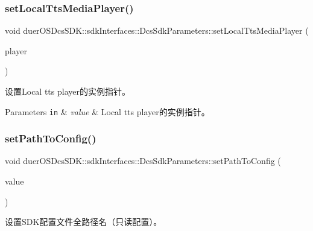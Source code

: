 \subsubsection{\texorpdfstring{set\+Local\+Tts\+Media\+Player()}{setLocalTtsMediaPlayer()}}
{\footnotesize\ttfamily void duer\+O\+S\+Dcs\+S\+D\+K\+::sdk\+Interfaces\+::\+Dcs\+Sdk\+Parameters\+::set\+Local\+Tts\+Media\+Player (\begin{DoxyParamCaption}\item[{std\+::shared\+\_\+ptr$<$ \hyperlink{classduerOSDcsSDK_1_1sdkInterfaces_1_1MediaPlayerInterface}{Media\+Player\+Interface} $>$}]{player }\end{DoxyParamCaption})\hspace{0.3cm}{\ttfamily [inline]}}



设置\+Local tts player的实例指针。 


\begin{DoxyParams}[1]{Parameters}
\mbox{\tt in}  & {\em value} & Local tts player的实例指针。 \\
\hline
\end{DoxyParams}
\mbox{\label{structduerOSDcsSDK_1_1sdkInterfaces_1_1DcsSdkParameters_a95c8300f4163e33cc6d639900afe1a6d}} 
\subsubsection{\texorpdfstring{set\+Path\+To\+Config()}{setPathToConfig()}}
{\footnotesize\ttfamily void duer\+O\+S\+Dcs\+S\+D\+K\+::sdk\+Interfaces\+::\+Dcs\+Sdk\+Parameters\+::set\+Path\+To\+Config (\begin{DoxyParamCaption}\item[{const std\+::string \&}]{value }\end{DoxyParamCaption})\hspace{0.3cm}{\ttfamily [inline]}}



设置\+S\+D\+K配置文件全路径名（只读配置）。 


